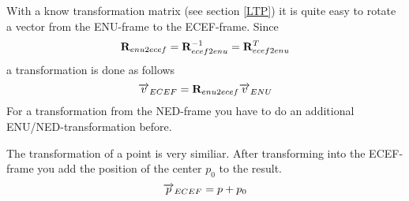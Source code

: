 With a know transformation matrix (see section \ref{LTP}) it is quite easy to rotate a vector from the ENU-frame to the ECEF-frame.
Since
\begin{equation}
\mat R_{enu2ecef} = \inv{\mat R_{ecef2enu}} = \transp{\mat R_{ecef2enu}}
\end{equation}
a transformation is done as follows
\begin{equation}
\vect v_{ECEF} = \mat R_{enu2ecef} \vect v_{ENU} 
\end{equation}
For a transformation from the NED-frame you have to do an additional ENU/NED-transformation before.


The transformation of a point is very similiar. After transforming into the ECEF-frame you add the position of the center  $p_0$ to the result.
\begin{equation}
\vect p_{ECEF} = p + p_0
\end{equation}
